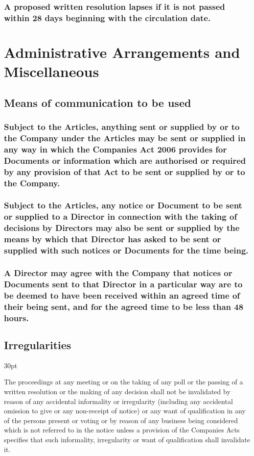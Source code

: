 \documentclass[12pt]{article}
\def\clauseindent{30pt}
\newenvironment{subindentpara}{\begin{adjustwidth}{\clauseindent}{}\begin{hanginglist}}{\end{hanginglist}\end{adjustwidth}}
\begin{document}
\subsubsection{A proposed written resolution lapses if it is not passed within 28 days beginning with the circulation date.}

\section*{Administrative Arrangements and Miscellaneous}
\subsection{Means of communication to be used}
\subsubsection{Subject to the Articles, anything sent or supplied by or to the Company under the Articles may be sent or supplied in any way in which the Companies Act 2006 provides for Documents or information which are authorised or required by any provision of that Act to be sent or supplied by or to the Company.}
\subsubsection{Subject to the Articles, any notice or Document to be sent or supplied to a Director in connection with the taking of decisions by Directors may also be sent or supplied by the means by which that Director has asked to be sent or supplied with such notices or Documents for the time being.}
\subsubsection{A Director may agree with the Company that notices or Documents sent to that Director in a particular way are to be deemed to have been received within an agreed time of their being sent, and for the agreed time to be less than 48 hours.}

\subsection{Irregularities}
\begin{subindentpara}
    \item The proceedings at any meeting or on the taking of any poll or the passing of a written resolution or the making of any decision shall not be invalidated by reason of any accidental informality or irregularity (including any accidental omission to give or any non-receipt of notice) or any want of qualification in any of the persons present or voting or by reason of any business being considered which is not referred to in the notice unless a provision of the Companies Acts specifies that such informality, irregularity or want of qualification shall invalidate it.
\end{subindentpara}
\end{document}
